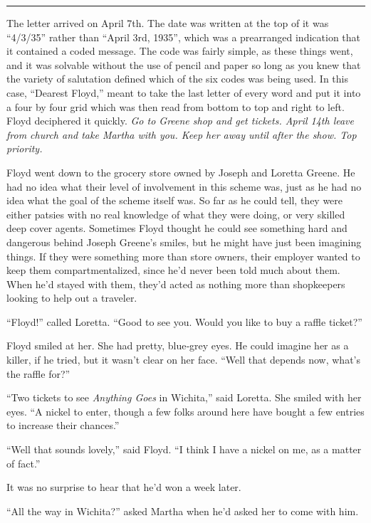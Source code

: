 \documentclass[ebook,12pt]{memoir}
\begin{document}
\begin{center}\rule{0.5\linewidth}{0.5pt}\end{center}

The letter arrived on April 7th. The date was written at the top of it
was ``4/3/35'' rather than ``April 3rd, 1935'', which was a prearranged
indication that it contained a coded message. The code was fairly
simple, as these things went, and it was solvable without the use of
pencil and paper so long as you knew that the variety of salutation
defined which of the six codes was being used. In this case, ``Dearest
Floyd,'' meant to take the last letter of every word and put it into a
four by four grid which was then read from bottom to top and right to
left. Floyd deciphered it quickly. \emph{Go to Greene shop and get
tickets. April 14th leave from church and take Martha with you. Keep her
away until after the show. Top priority.}

Floyd went down to the grocery store owned by Joseph and Loretta Greene.
He had no idea what their level of involvement in this scheme was, just
as he had no idea what the goal of the scheme itself was. So far as he
could tell, they were either patsies with no real knowledge of what they
were doing, or very skilled deep cover agents. Sometimes Floyd thought
he could see something hard and dangerous behind Joseph Greene's smiles,
but he might have just been imagining things. If they were something
more than store owners, their employer wanted to keep them
compartmentalized, since he'd never been told much about them. When he'd
stayed with them, they'd acted as nothing more than shopkeepers looking
to help out a traveler.

``Floyd!'' called Loretta. ``Good to see you. Would you like to buy a
raffle ticket?''

Floyd smiled at her. She had pretty, blue‐grey eyes. He could imagine
her as a killer, if he tried, but it wasn't clear on her face. ``Well
that depends now, what's the raffle for?''

``Two tickets to see \emph{Anything Goes} in Wichita,'' said Loretta.
She smiled with her eyes. ``A nickel to enter, though a few folks around
here have bought a few entries to increase their chances.''

``Well that sounds lovely,'' said Floyd. ``I think I have a nickel on
me, as a matter of fact.''

It was no surprise to hear that he'd won a week later.

``All the way in Wichita?'' asked Martha when he'd asked her to come
with him.
\end{document}
